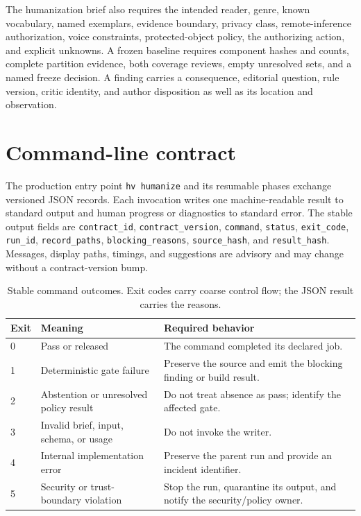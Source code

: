 The humanization brief also requires the intended reader, genre, known
vocabulary, named exemplars, evidence boundary, privacy class, remote-inference
authorization, voice constraints, protected-object policy, the authorizing
action, and explicit unknowns. A frozen baseline requires component hashes and
counts, complete partition evidence, both coverage reviews, empty unresolved
sets, and a named freeze decision. A finding carries a consequence, editorial
question, rule version, critic identity, and author disposition as well as its
location and observation.

\section{Command-line contract}
\label{sec:contract-cli}

The production entry point \texttt{hv humanize} and its resumable phases exchange
versioned JSON records. Each invocation writes one machine-readable result to
standard output and human progress or diagnostics to standard error. The stable
output fields are \texttt{contract\_id}, \texttt{contract\_version},
\texttt{command}, \texttt{status}, \texttt{exit\_code}, \texttt{run\_id},
\texttt{record\_paths}, \texttt{blocking\_reasons}, \texttt{source\_hash},
and \texttt{result\_hash}. Messages, display paths, timings, and suggestions
are advisory and may change without a contract-version bump.

\begin{table}[H]
\centering
\small
\begin{tabularx}{\textwidth}{@{}p{}p{}L@{}}
\toprule
Exit & Meaning & Required behavior \\
 & Pass or released & The command completed its declared job. \\
1 & Deterministic gate failure & Preserve the source and emit the blocking
finding or build result. \\
2 & Abstention or unresolved policy result & Do not treat absence as pass;
identify the affected gate. \\
3 & Invalid brief, input, schema, or usage & Do not invoke the writer. \\
4 & Internal implementation error & Preserve the parent run and provide an
incident identifier. \\
5 & Security or trust-boundary violation & Stop the run, quarantine its output,
and notify the security/policy owner. \\
\bottomrule
\end{tabularx}
\caption{Stable command outcomes. Exit codes carry coarse control flow; the
JSON result carries the reasons.}
\label{tab:contract-exit-codes}
\end{table}

